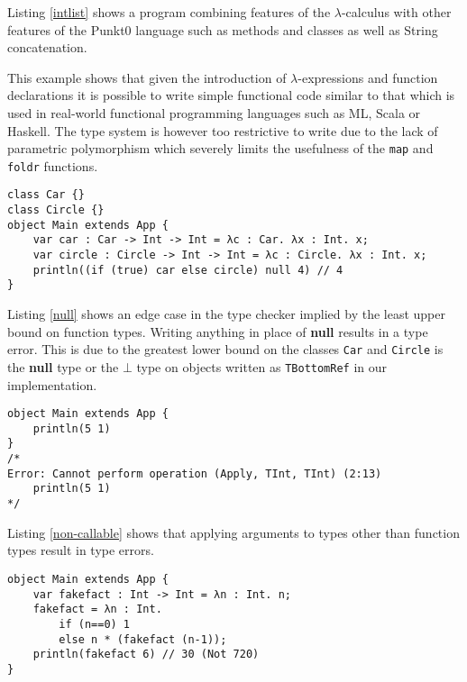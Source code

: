Listing \ref{intlist} shows a program combining features of the $\lambda$-calculus with other features of the Punkt0 language such as methods and classes as well as String concatenation.

This example shows that given the introduction of $\lambda$-expressions and function declarations it is possible to write simple functional code similar to that which is used in real-world functional programming languages such as ML, Scala or Haskell. The type system is however too restrictive to write due to the lack of parametric polymorphism which severely limits the usefulness of the \texttt{map} and \texttt{foldr} functions. 

\begin{lstlisting}[caption=Example showing edge case of typing rules,label=null]
class Car {}
class Circle {}
object Main extends App {
    var car : Car -> Int -> Int = λc : Car. λx : Int. x;
    var circle : Circle -> Int -> Int = λc : Circle. λx : Int. x;
    println((if (true) car else circle) null 4) // 4
}
\end{lstlisting}

Listing \ref{null} shows an edge case in the type checker implied by the least upper bound on function types. Writing anything in place of \textbf{null} results in a type error. This is due to the greatest lower bound on the classes \texttt{Car} and \texttt{Circle} is the \textbf{null} type or the $\bot$ type on objects written as \texttt{TBottomRef} in our implementation.

\noindent
\begin{minipage}{0.95\linewidth}
\begin{lstlisting}[caption=Int cannot be applied to Int, label=non-callable]
object Main extends App {
    println(5 1)
}
/*
Error: Cannot perform operation (Apply, TInt, TInt) (2:13)
    println(5 1)
*/
\end{lstlisting}
\end{minipage}

Listing \ref{non-callable} shows that applying arguments to types other than function types result in type errors.

\noindent
\begin{minipage}{0.95\linewidth}
\begin{lstlisting}[caption=Variables refer to previous definition in $\lambda$ body for assignment, label=assign-lambda]
object Main extends App {
    var fakefact : Int -> Int = λn : Int. n;
    fakefact = λn : Int.
    	if (n==0) 1
    	else n * (fakefact (n-1));
    println(fakefact 6) // 30 (Not 720)
}
\end{lstlisting}
\end{minipage}

